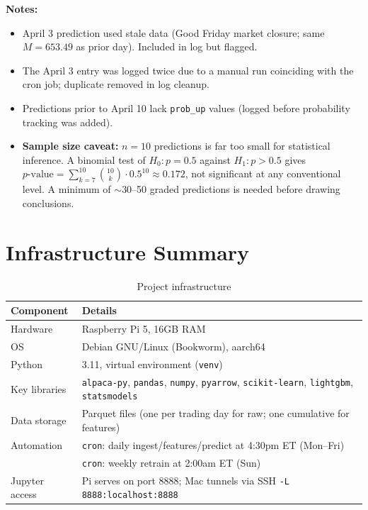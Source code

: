 \documentclass[preprint,12pt]{elsarticle}
\begin{document}
\textbf{Notes:}
\begin{itemize}
    \item April 3 prediction used stale data (Good Friday market closure; same $M = 653.49$ as prior day). Included in log but flagged.
    \item The April 3 entry was logged twice due to a manual run coinciding with the cron job; duplicate removed in log cleanup.
    \item Predictions prior to April 10 lack \texttt{prob\_up} values (logged before probability tracking was added).
    \item \textbf{Sample size caveat:} $n = 10$ predictions is far too small for statistical inference. A binomial test of $H_0: p = 0.5$ against $H_1: p > 0.5$ gives $p\text{-value} = \sum_{k=7}^{10} \binom{10}{k} \cdot 0.5^{10} \approx 0.172$, not significant at any conventional level. A minimum of $\sim$30--50 graded predictions is needed before drawing conclusions.
\end{itemize}

\section{Infrastructure Summary}

\begin{table}[htbp]
\centering
\caption{Project infrastructure}
\begin{tabular}{ll}
\toprule
Component & Details \\
\midrule
Hardware        & Raspberry Pi 5, 16GB RAM \\
OS              & Debian GNU/Linux (Bookworm), aarch64 \\
Python          & 3.11, virtual environment (\texttt{venv}) \\
Key libraries   & \texttt{alpaca-py}, \texttt{pandas}, \texttt{numpy}, \texttt{pyarrow}, \texttt{scikit-learn}, \texttt{lightgbm}, \texttt{statsmodels} \\
Data storage    & Parquet files (one per trading day for raw; one cumulative for features) \\
Automation      & \texttt{cron}: daily ingest/features/predict at 4:30pm ET (Mon--Fri) \\
                & \texttt{cron}: weekly retrain at 2:00am ET (Sun) \\
Jupyter access  & Pi serves on port 8888; Mac tunnels via SSH \texttt{-L 8888:localhost:8888} \\
\bottomrule
\end{tabular}
\end{table}
\end{document}
